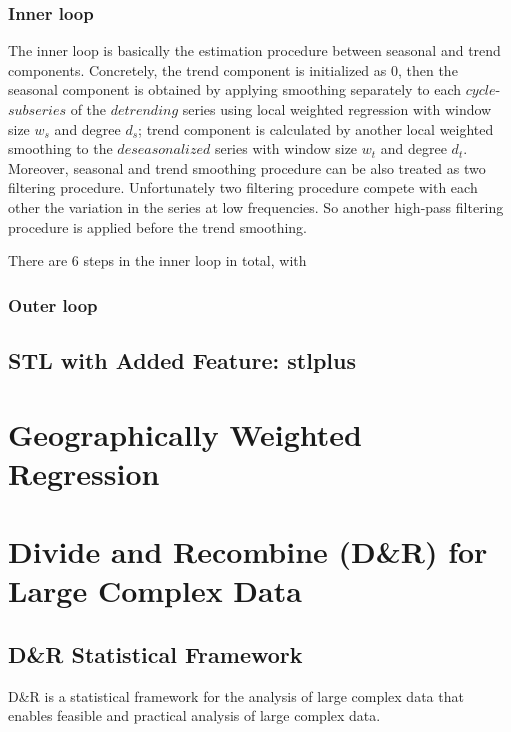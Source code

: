 \subsubsection{Inner loop}

The inner loop is basically the estimation procedure between seasonal and trend
components. Concretely, the trend component is initialized as 0, then the seasonal
component is obtained by applying smoothing separately to each $cycle$-$subseries$ 
of the $detrending$ series using local weighted regression with window size $w_s$ 
and degree $d_s$; trend component is calculated by another local weighted smoothing
to the $deseasonalized$ series with window size $w_t$ and degree $d_t$. Moreover, 
seasonal and trend smoothing procedure can be also treated as two filtering 
procedure. Unfortunately two filtering procedure compete with each other the 
variation in the series at low frequencies. So another high-pass filtering procedure
is applied before the trend smoothing.

There are 6 steps in the inner loop in total, with



\subsubsection{Outer loop}

\subsection{STL with Added Feature: stlplus}

\section{Geographically Weighted Regression}

\section{Divide and Recombine (D\&R) for Large Complex Data}

\subsection{D\&R Statistical Framework}

D\&R \cite{Guha:2012} is a statistical framework for the analysis of large complex
data that enables feasible and practical analysis of large complex data. 

